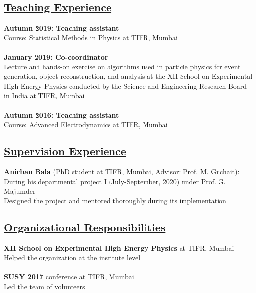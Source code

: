 \documentclass[a4paper,11pt]{article}
\begin{document}
\subsection*{\underline{Teaching Experience}}

\textbf{Autumn 2019: Teaching assistant}\\
Course: Statistical Methods in Physics at TIFR, Mumbai \\
\\
\textbf{January 2019: Co-coordinator}\\
Lecture and hands-on exercise on algorithms used in particle physics for event generation, object reconstruction, and analysis
at the XII School on Experimental High Energy Physics conducted by the Science and Engineering Research Board in India at TIFR, Mumbai \\
\\
\textbf{Autumn 2016: Teaching assistant}\\
Course: Advanced Electrodynamics at TIFR, Mumbai\\

\subsection*{\underline{Supervision Experience}}

\textbf{Anirban Bala} (PhD student at TIFR, Mumbai, Advisor: Prof. M. Guchait):\\
During his departmental project I (July-September, 2020) under Prof. G. Majumder \\
Designed the project and mentored thoroughly during its implementation\\

\subsection*{\underline{Organizational Responsibilities}}

\textbf{XII School on Experimental High Energy Physics} at TIFR, Mumbai\\
Helped the organization at the institute level\\
\\
\textbf{SUSY 2017} conference at TIFR, Mumbai\\
Led the team of volunteers \\
\end{document}
